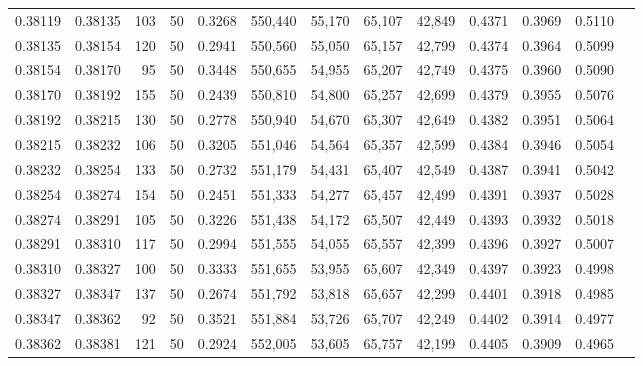 \begin{tabular}{rrrrrrrrrrrrr}
0.38119 & 0.38135 &   103 &  50 &                                     0.3268 & 550,440 &  55,170 &  65,107 &  42,849 & 0.4371 & 0.3969 & 0.5110 \\
0.38135 & 0.38154 &   120 &  50 &                                     0.2941 & 550,560 &  55,050 &  65,157 &  42,799 & 0.4374 & 0.3964 & 0.5099 \\
0.38154 & 0.38170 &    95 &  50 &                                     0.3448 & 550,655 &  54,955 &  65,207 &  42,749 & 0.4375 & 0.3960 & 0.5090 \\
0.38170 & 0.38192 &   155 &  50 &                                     0.2439 & 550,810 &  54,800 &  65,257 &  42,699 & 0.4379 & 0.3955 & 0.5076 \\
0.38192 & 0.38215 &   130 &  50 &                                     0.2778 & 550,940 &  54,670 &  65,307 &  42,649 & 0.4382 & 0.3951 & 0.5064 \\
0.38215 & 0.38232 &   106 &  50 &                                     0.3205 & 551,046 &  54,564 &  65,357 &  42,599 & 0.4384 & 0.3946 & 0.5054 \\
0.38232 & 0.38254 &   133 &  50 &                                     0.2732 & 551,179 &  54,431 &  65,407 &  42,549 & 0.4387 & 0.3941 & 0.5042 \\
0.38254 & 0.38274 &   154 &  50 &                                     0.2451 & 551,333 &  54,277 &  65,457 &  42,499 & 0.4391 & 0.3937 & 0.5028 \\
0.38274 & 0.38291 &   105 &  50 &                                     0.3226 & 551,438 &  54,172 &  65,507 &  42,449 & 0.4393 & 0.3932 & 0.5018 \\
0.38291 & 0.38310 &   117 &  50 &                                     0.2994 & 551,555 &  54,055 &  65,557 &  42,399 & 0.4396 & 0.3927 & 0.5007 \\
0.38310 & 0.38327 &   100 &  50 &                                     0.3333 & 551,655 &  53,955 &  65,607 &  42,349 & 0.4397 & 0.3923 & 0.4998 \\
0.38327 & 0.38347 &   137 &  50 &                                     0.2674 & 551,792 &  53,818 &  65,657 &  42,299 & 0.4401 & 0.3918 & 0.4985 \\
0.38347 & 0.38362 &    92 &  50 &                                     0.3521 & 551,884 &  53,726 &  65,707 &  42,249 & 0.4402 & 0.3914 & 0.4977 \\
0.38362 & 0.38381 &   121 &  50 &                                     0.2924 & 552,005 &  53,605 &  65,757 &  42,199 & 0.4405 & 0.3909 & 0.4965 \\

\end{tabular}
